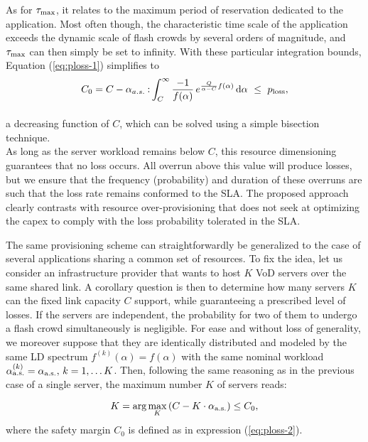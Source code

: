 \documentclass[twoside]{article}
\begin{document}
As for $\tau_{\rm max}$, it relates to the maximum period  of reservation dedicated to the application. Most often though, the characteristic time scale of the application exceeds the dynamic scale of flash crowds  by several orders of magnitude, and $\tau_{\rm max}$ can then simply be set to infinity. With these particular integration bounds, Equation (\ref{eq:ploss-1}) simplifies to
\begin{equation}
\begin{array}{c}
\displaystyle{C_0 = C-\alpha_{a.s.} \:{\rm :} \int_{C}^{\infty} \frac{-1} {f(\alpha)}\,e^{\frac{Q}{\alpha-C} f(\alpha)}\,{\rm d}\alpha ~ \leq ~ p_{\rm loss}},
\\[5mm]
\end{array}
\label{eq:ploss-2}
\end{equation}
a decreasing function of $C$, which can be solved using a simple bisection technique. \\
As long as the server workload remains below $C$,  this resource dimensioning  guarantees that no loss occurs. All overrun above this value will produce losses, but we ensure that the frequency (probability) and duration of these overruns are such that the loss rate remains  conformed to the SLA. 
The proposed approach clearly contrasts  with resource over-provisioning  that does not seek at optimizing the {\sc capex} to comply with the loss probability tolerated in the SLA. 


The same provisioning scheme can straightforwardly be generalized to the case of several applications sharing a common set of resources. To fix the idea, let us consider an infrastructure provider that wants to  host $K$ VoD servers over the same shared link. A corollary question is then to determine how many servers $K$ can the fixed link capacity $C$ support, while guaranteeing  a prescribed level of losses. If the servers are independent, the probability for two of them to undergo a flash crowd simultaneously is negligible. For ease and without loss of generality, we moreover suppose that they are identically distributed and modeled by the same LD spectrum $f^{(k)}(\alpha)=f(\alpha)$ with the same nominal workload $\alpha^{(k)}_{\rm a.s.}=\alpha_{\rm a.s.},\,k=1,\ldots K$. 
Then, following the same reasoning as in the previous case of a single server, the maximum number $K$ of servers reads:

\begin{equation}
K = \mbox{arg}\max_{K} \left( C -K\cdot \alpha_{\rm a.s.}\right) \leq C_0,
\end{equation}
where the safety margin $C_0$ is defined as in expression (\ref{eq:ploss-2}).
\end{document}
